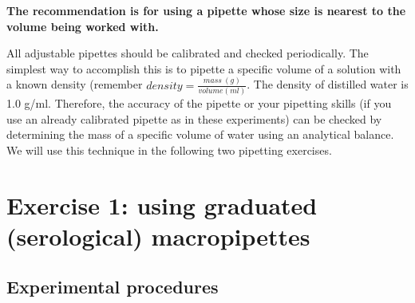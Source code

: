 \documentclass[]{book}
\let\BeginKnitrBlock\begin \let\EndKnitrBlock\end
\begin{document}
\BeginKnitrBlock{rmdnote}
\textbf{The recommendation is for using a pipette whose size is nearest to the volume being worked with.}
\EndKnitrBlock{rmdnote}

All adjustable pipettes should be calibrated and checked periodically. The simplest way to accomplish this is to pipette a specific volume of a solution with a known density (remember \(density = \frac{mass\ (g)}{volume (ml)}\). The density of distilled water is 1.0 g/ml. Therefore, the accuracy of the pipette or your pipetting skills (if you use an already calibrated pipette as in these experiments) can be checked by determining the mass of a specific volume of water using an analytical balance. We will use this technique in the following two pipetting exercises.

\hypertarget{exercise-1-using-graduated-serological-macropipettes}{%
\section{Exercise 1: using graduated (serological) macropipettes}\label{exercise-1-using-graduated-serological-macropipettes}}

\hypertarget{experimental-procedures-5}{%
\subsection{Experimental procedures}\label{experimental-procedures-5}}
\end{document}
